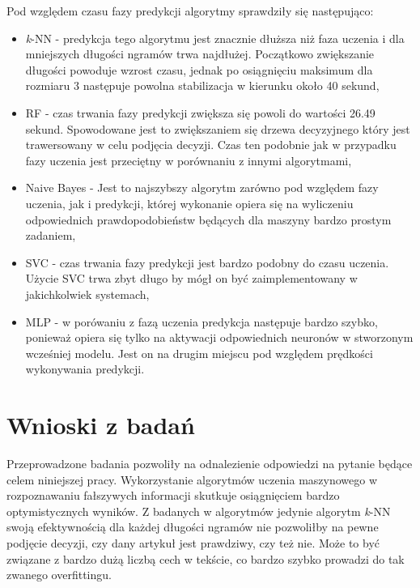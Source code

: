 \begin{itemize}
    
    Pod względem czasu fazy predykcji algorytmy sprawdziły się następująco:
    
    \begin{itemize}
        \item \textit{k}-NN -
        predykcja tego algorytmu jest znacznie dłuższa niż faza uczenia i dla mniejszych długości ngramów trwa
        najdłużej. Początkowo zwiększanie długości powoduje wzrost czasu, jednak po osiągnięciu maksimum dla rozmiaru 3
        następuje powolna stabilizacja w kierunku około 40 sekund,
        \item RF -
        czas trwania fazy predykcji zwiększa się powoli do wartości 26.49 sekund. Spowodowane jest to zwiększaniem
        się drzewa decyzyjnego który jest trawersowany w celu podjęcia decyzji. Czas ten podobnie jak w przypadku 
        fazy uczenia jest przeciętny w porównaniu z innymi algorytmami,
        \item Naive Bayes -
        Jest to najszybszy algorytm zarówno pod względem fazy uczenia, jak i predykcji, której wykonanie 
        opiera się na wyliczeniu odpowiednich prawdopodobieństw będących dla maszyny bardzo prostym zadaniem,
        \item SVC -
        czas trwania fazy predykcji jest bardzo podobny do czasu uczenia. Użycie SVC trwa zbyt długo
        by mógł on być zaimplementowany w jakichkolwiek systemach,
        \item MLP -
        w porówaniu z fazą uczenia predykcja następuje bardzo szybko, ponieważ opiera się tylko
        na aktywacji odpowiednich neuronów w stworzonym wcześniej modelu. Jest on na drugim miejscu
        pod względem prędkości wykonywania predykcji.
    \end{itemize}
\end{itemize}




\section{Wnioski z badań}
Przeprowadzone badania pozwoliły na odnalezienie odpowiedzi na pytanie 
będące celem niniejszej pracy. Wykorzystanie algorytmów uczenia maszynowego 
w rozpoznawaniu fałszywych informacji skutkuje osiągnięciem bardzo optymistycznych wyników.
Z badanych w algorytmów jedynie algorytm \textit{k}-NN swoją efektywnością dla 
każdej długości ngramów nie pozwoliłby na pewne podjęcie decyzji, czy dany artykuł jest prawdziwy, czy też nie.
Może to być związane z bardzo dużą liczbą cech w tekście, co bardzo szybko prowadzi do tak zwanego 
overfittingu. 

